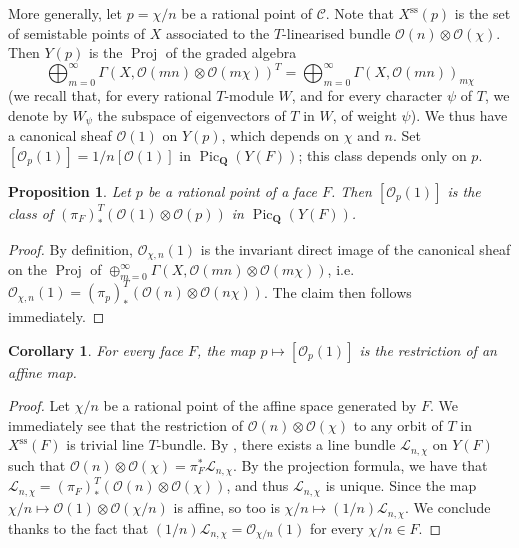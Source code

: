 \documentclass{article}
\theoremstyle{plain}
\newtheorem*{proposition}{Proposition}
\newtheorem*{corollary}{Corollary}
\theoremstyle{definition}
\newcommand{\sh}[1]{{\mathscr{#1}}}
\newcommand{\QQ}{\mathbf{Q}}
\renewcommand{\ss}{\mathrm{ss}}
\DeclareMathOperator{\Pic}{Pic}
\DeclareMathOperator{\Proj}{Proj}
\newcommand{\oldpage}[1]{\marginpar{\footnotesize$\Big\vert$ \textit{p.~#1}}}
\begin{document}
More generally, let $p=\chi/n$ be a rational point of $\mathcal{C}$.
Note that $X^\ss(p)$ is the set of semistable points of $X$ associated to the
\oldpage{514}
$T$-linearised bundle $\sh{O}(n)\otimes\sh{O}(\chi)$.
Then $Y(p)$ is the $\Proj$ of the graded algebra
\[
  \bigoplus_{m=0}^\infty \Gamma(X,\sh{O}(mn)\otimes\sh{O}(m\chi))^T = \bigoplus_{m=0}^\infty \Gamma(X,\sh{O}(mn))_{m\chi}
\]
(we recall that, for every rational $T$-module $W$, and for every character $\psi$ of $T$, we denote by $W_\psi$ the subspace of eigenvectors of $T$ in $W$, of weight $\psi$).
We thus have a canonical sheaf $\sh{O}(1)$ on $Y(p)$, which depends on $\chi$ and $n$.
Set $[\sh{O}_p(1)] = 1/n[\sh{O}(1)]$ in $\Pic_\QQ(Y(F))$;
this class depends only on $p$.

\begin{proposition}
  Let $p$ be a rational point of a face $F$.
  Then $[\sh{O}_p(1)]$ is the class of $(\pi_F)_*^T(\sh{O}(1)\otimes\sh{O}(p))$ in $\Pic_\QQ(Y(F))$.
\end{proposition}

\begin{proof}
  By definition, $\sh{O}_{\chi,n}(1)$ is the invariant direct image of the canonical sheaf on the $\Proj$ of $\oplus_{m=0}^\infty\Gamma(X,\sh{O}(mn)\otimes\sh{O}(m\chi))$, i.e. $\sh{O}_{\chi,n}(1) = (\pi_p)_*^T(\sh{O}(n)\otimes\sh{O}(n\chi))$.
  The claim then follows immediately.
\end{proof}

\begin{corollary}
  For every face $F$, the map $p\mapsto[\sh{O}_p(1)]$ is the restriction of an affine map.
\end{corollary}

\begin{proof}
  Let $\chi/n$ be a rational point of the affine space generated by $F$.
  We immediately see that the restriction of $\sh{O}(n)\otimes\sh{O}(\chi)$ to any orbit of $T$ in $X^\ss(F)$ is trivial line $T$-bundle.
  By \cite[Proposition~3]{Kra2}, there exists a line bundle $\sh{L}_{n,\chi}$ on $Y(F)$ such that $\sh{O}(n)\otimes\sh{O}(\chi)=\pi_F^*\sh{L}_{n,\chi}$.
  By the projection formula, we have that $\sh{L}_{n,\chi}=(\pi_F)_*^T(\sh{O}(n)\otimes\sh{O}(\chi))$, and thus $\sh{L}_{n,\chi}$ is unique.
  Since the map $\chi/n\mapsto\sh{O}(1)\otimes\sh{O}(\chi/n)$ is affine, so too is $\chi/n\mapsto(1/n)\sh{L}_{n,\chi}$.
  We conclude thanks to the fact that $(1/n)\sh{L}_{n,\chi}=\sh{O}_{\chi/n}(1)$ for every $\chi/n\in F$.
\end{proof}
\end{document}
